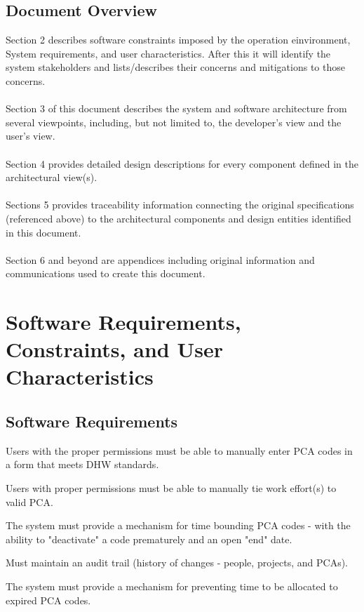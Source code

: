 \documentclass[letterpaper]{article}
\begin{document}
\subsection{\bfseries{Document Overview}}
Section 2 describes software constraints imposed by the operation einvironment, System requirements, and user characteristics. After this it will identify the system stakeholders and lists/describes their concerns and mitigations to those concerns. \\
\\
Section 3 of this document describes the system and software
architecture from several viewpoints, including, but not limited to,
the developer{\textquoteright}s view and the user{\textquoteright}s
view.\\
\\
Section 4 provides detailed design descriptions for every component
defined in the architectural view(s). \\
\\
Sections 5 provides traceability information connecting the original specifications
(referenced above) to the architectural components and design entities identified in this document.\\
\\
Section 6 and beyond are appendices including original information and communications used to create this document.
\section{\bfseries{Software Requirements, Constraints, and User Characteristics}}
\subsection{Software Requirements}
 
Users with the proper permissions must be able to manually enter PCA codes in a form that meets DHW standards.

Users with proper permissions must be able to manually tie work effort(s) to valid PCA.

The system must provide a mechanism for time bounding PCA codes - with the ability to "deactivate" a code prematurely and an open "end" date.

Must maintain an audit trail (history of changes - people, projects, and PCAs).

The system must provide a mechanism for preventing time to be allocated to expired PCA codes.
\end{document}
